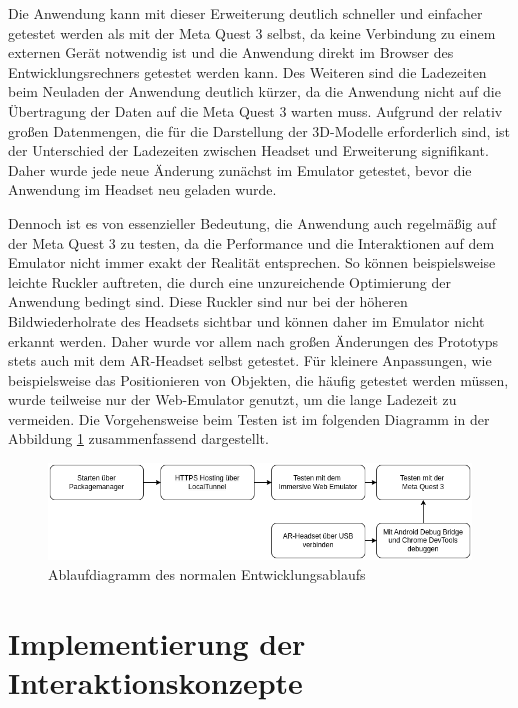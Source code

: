 Die Anwendung kann mit dieser Erweiterung deutlich schneller und einfacher getestet werden als mit der Meta Quest 3 selbst, da keine Verbindung zu einem externen Gerät notwendig ist und die Anwendung direkt im Browser des Entwicklungsrechners getestet werden kann.
Des Weiteren sind die Ladezeiten beim Neuladen der Anwendung deutlich kürzer, da die Anwendung nicht auf die Übertragung der Daten auf die Meta Quest 3 warten muss.
Aufgrund der relativ großen Datenmengen, die für die Darstellung der 3D-Modelle erforderlich sind, ist der Unterschied der Ladezeiten zwischen Headset und Erweiterung signifikant.
Daher wurde jede neue Änderung zunächst im Emulator getestet, bevor die Anwendung im Headset neu geladen wurde.

Dennoch ist es von essenzieller Bedeutung, die Anwendung auch regelmäßig auf der Meta Quest 3 zu testen, da die Performance und die Interaktionen auf dem Emulator nicht immer exakt der Realität entsprechen.
So können beispielsweise leichte Ruckler auftreten, die durch eine unzureichende Optimierung der Anwendung bedingt sind.
Diese Ruckler sind nur bei der höheren Bildwiederholrate des Headsets sichtbar und können daher im Emulator nicht erkannt werden.
Daher wurde vor allem nach großen Änderungen des Prototyps stets auch mit dem AR-Headset selbst getestet.
Für kleinere Anpassungen, wie beispielsweise das Positionieren von Objekten, die häufig getestet werden müssen, wurde teilweise nur der Web-Emulator genutzt, um die lange Ladezeit zu vermeiden.
Die Vorgehensweise beim Testen ist im folgenden Diagramm in der Abbildung \ref{fig:webxr-entwicklung} zusammenfassend dargestellt.

\begin{figure}[H]
    \centering
    \includegraphics[width=1\textwidth]{images/WebXR-Entwicklung.png}
    \caption{Ablaufdiagramm des normalen Entwicklungsablaufs}
    \label{fig:webxr-entwicklung}
\end{figure}

\newpage

\section{Implementierung der Interaktionskonzepte}

